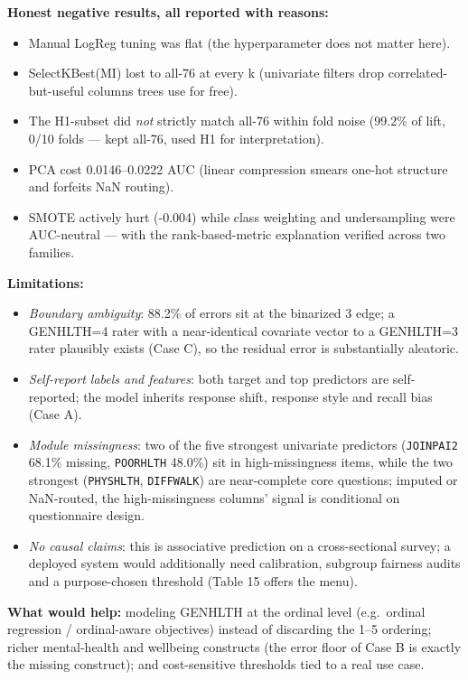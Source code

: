\documentclass[11pt,a4paper]{article}
\providecommand{\tightlist}{\setlength{\itemsep}{2pt}\setlength{\parskip}{0pt}}
\begin{document}
\textbf{Honest negative results, all reported with reasons:}

\begin{itemize}
\tightlist
\item
  Manual LogReg tuning was flat (the hyperparameter does not matter
  here).
\item
  SelectKBest(MI) lost to all-76 at every k (univariate filters drop
  correlated-but-useful columns trees use for free).
\item
  The H1-subset did \emph{not} strictly match all-76 within fold noise
  (99.2\% of lift, 0/10 folds --- kept all-76, used H1 for
  interpretation).
\item
  PCA cost 0.0146--0.0222 AUC (linear compression smears one-hot
  structure and forfeits NaN routing).
\item
  SMOTE actively hurt (-0.004) while class weighting and undersampling
  were AUC-neutral --- with the rank-based-metric explanation verified
  across two families.
\end{itemize}

\textbf{Limitations:}

\begin{itemize}
\tightlist
\item
  \emph{Boundary ambiguity}: 88.2\% of errors sit at the binarized
  3 edge; a GENHLTH=4 rater with a near-identical covariate
  vector to a GENHLTH=3 rater plausibly exists (Case C), so the residual
  error is substantially aleatoric.
\item
  \emph{Self-report labels and features}: both target and top predictors
  are self-reported; the model inherits response shift, response style
  and recall bias (Case A).
\item
  \emph{Module missingness}: two of the five strongest univariate
  predictors (\texttt{JOINPAI2} 68.1\% missing, \texttt{POORHLTH}
  48.0\%) sit in high-missingness items, while the two strongest
  (\texttt{PHYSHLTH}, \texttt{DIFFWALK}) are near-complete core
  questions; imputed or NaN-routed, the high-missingness columns' signal
  is conditional on questionnaire design.
\item
  \emph{No causal claims}: this is associative prediction on a
  cross-sectional survey; a deployed system would additionally need
  calibration, subgroup fairness audits and a purpose-chosen threshold
  (Table 15 offers the menu).
\end{itemize}

\textbf{What would help:} modeling GENHLTH at the ordinal level
(e.g.~ordinal regression / ordinal-aware objectives) instead of
discarding the 1--5 ordering; richer mental-health and wellbeing
constructs (the error floor of Case B is exactly the missing construct);
and cost-sensitive thresholds tied to a real use case.
\end{document}
